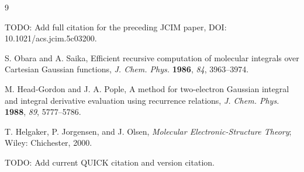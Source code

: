 \documentclass[journal=jcisd8,manuscript=article]{achemso}
\begin{document}
\begin{thebibliography}{9}

TODO: Add full citation for the preceding JCIM paper, DOI: 10.1021/acs.jcim.5c03200.

S. Obara and A. Saika, Efficient recursive computation of molecular integrals over Cartesian Gaussian functions, \emph{J. Chem. Phys.} \textbf{1986}, \emph{84}, 3963--3974.

M. Head-Gordon and J. A. Pople, A method for two-electron Gaussian integral and integral derivative evaluation using recurrence relations, \emph{J. Chem. Phys.} \textbf{1988}, \emph{89}, 5777--5786.

T. Helgaker, P. Jorgensen, and J. Olsen, \emph{Molecular Electronic-Structure Theory}; Wiley: Chichester, 2000.

TODO: Add current QUICK citation and version citation.

\end{thebibliography}
\end{document}

